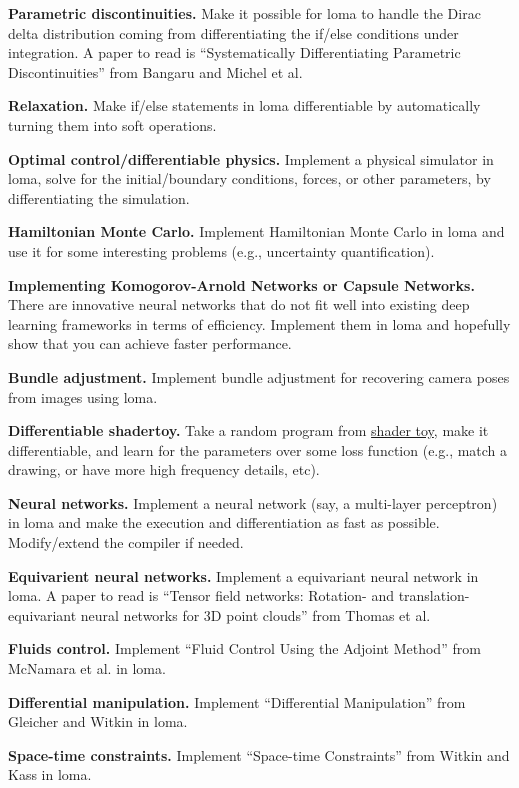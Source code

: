 \textbf{Parametric discontinuities.} Make it possible for loma to handle the Dirac delta distribution coming from differentiating the if/else conditions under integration. A paper to read is ``Systematically Differentiating Parametric Discontinuities'' from Bangaru and Michel et al.

\textbf{Relaxation.} Make if/else statements in loma differentiable by automatically turning them into soft operations.

\textbf{Optimal control/differentiable physics.} Implement a physical simulator in loma, solve for the initial/boundary conditions, forces, or other parameters, by differentiating the simulation. 

\textbf{Hamiltonian Monte Carlo.} Implement Hamiltonian Monte Carlo in loma and use it for some interesting problems (e.g., uncertainty quantification).

\textbf{Implementing Komogorov-Arnold Networks or Capsule Networks.} There are innovative neural networks that do not fit well into existing deep learning frameworks in terms of efficiency. Implement them in loma and hopefully show that you can achieve faster performance.  

\textbf{Bundle adjustment.} Implement bundle adjustment for recovering camera poses from images using loma.

\textbf{Differentiable shadertoy.} Take a random program from \href{https://www.shadertoy.com/}{shader toy}, make it differentiable, and learn for the parameters over some loss function (e.g., match a drawing, or have more high frequency details, etc).

\textbf{Neural networks.} Implement a neural network (say, a multi-layer perceptron) in loma and make the execution and differentiation as fast as possible. Modify/extend the compiler if needed.

\textbf{Equivarient neural networks.} Implement a equivariant neural network in loma. A paper to read is ``Tensor field networks: Rotation- and translation-equivariant neural networks for 3D point clouds'' from Thomas et al.

\textbf{Fluids control.} Implement ``Fluid Control Using the Adjoint Method'' from McNamara et al. in loma.

\textbf{Differential manipulation.} Implement ``Differential Manipulation'' from Gleicher and Witkin in loma.

\textbf{Space-time constraints.} Implement ``Space-time Constraints'' from Witkin and Kass in loma.

